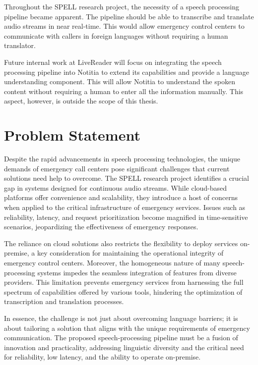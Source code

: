 Throughout the SPELL research project, the necessity of a speech processing pipeline became apparent. The pipeline 
should be able to transcribe and translate audio streams in near real-time. This would allow emergency control centers 
to communicate with callers in foreign languages without requiring a human translator.

Future internal work at LiveReader will focus on integrating the speech processing pipeline into Notitia to extend its 
capabilities and provide a language understanding component. This will allow Notitia to understand the spoken content 
without requiring a human to enter all the information manually. This aspect, however, is outside the scope of this 
thesis.


\section{Problem Statement}

Despite the rapid advancements in speech processing technologies, the unique demands of emergency call centers pose 
significant challenges that current solutions need help to overcome. The SPELL research project identifies a crucial gap 
in systems designed for continuous audio streams. While cloud-based platforms offer convenience and 
scalability, they introduce a host of concerns when applied to the critical infrastructure of emergency services. 
Issues such as reliability, latency, and request prioritization become magnified in time-sensitive scenarios, 
jeopardizing the effectiveness of emergency responses.

The reliance on cloud solutions also restricts the flexibility to deploy services on-premise, a key consideration for 
maintaining the operational integrity of emergency control centers. Moreover, the homogeneous nature of many 
speech-processing systems impedes the seamless integration of features from diverse providers. This limitation prevents 
emergency services from harnessing the full spectrum of capabilities offered by various tools, hindering the 
optimization of transcription and translation processes.

In essence, the challenge is not just about overcoming language barriers; it is about tailoring a solution that aligns 
with the unique requirements of emergency communication. The proposed speech-processing pipeline must be a fusion of 
innovation and practicality, addressing linguistic diversity and the critical need for reliability, low 
latency, and the ability to operate on-premise.

